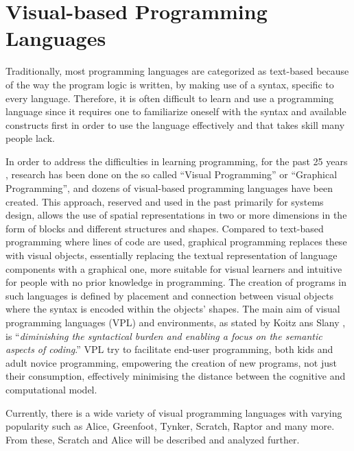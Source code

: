 \section{Visual-based Programming Languages}
\label{sec:visual_based_programming_languages}

Traditionally, most programming languages are categorized as text-based because of the way the program logic is written, by making use of a syntax, specific to every language. Therefore, it is often difficult to learn and use a programming language since it requires one to familiarize oneself with the syntax and available constructs first in order to use the language effectively and that takes skill many people lack. 

In order to address the difficulties in learning programming, for the past 25 years , research has been done on the so called “Visual Programming” or “Graphical Programming”, and dozens of visual-based programming languages have been created. This approach, reserved and used in the past primarily for systems design, allows the use of spatial representations in two or more dimensions in the form of blocks and different structures and shapes. Compared to text-based programming where lines of code are used, graphical programming replaces these with visual objects, essentially replacing the textual representation of language components with a graphical one, more suitable for visual learners and intuitive for people with no prior knowledge in programming. The creation of programs in such languages is defined by placement and connection between visual objects where the syntax is encoded within the objects' shapes.  
The main aim of visual programming languages (VPL) and environments, as stated by Koitz ans Slany \cite{KoitzSlany14}, is “\textit{diminishing the syntactical burden and enabling a focus on the semantic aspects of coding}.” VPL try to facilitate end-user programming, both kids and adult novice programming, empowering the creation of new programs, not just their consumption, effectively minimising the distance between the cognitive and computational model.

Currently, there is a wide variety of visual programming languages with varying popularity such as Alice, Greenfoot, Tynker, Scratch, Raptor and many more. From these, Scratch and Alice will be described and analyzed further.

